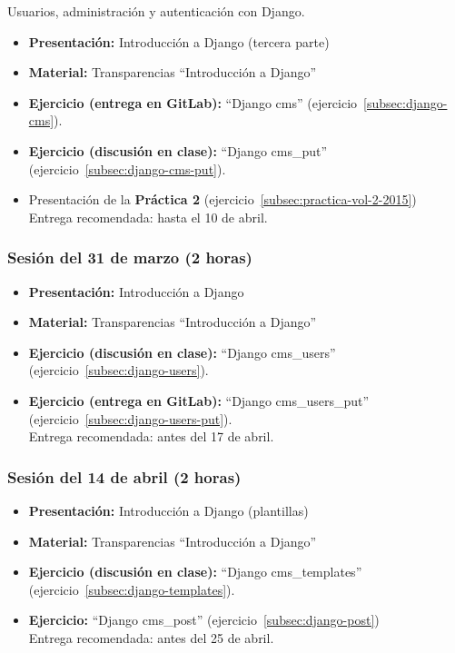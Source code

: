 \documentclass[a4paper,12pt]{article}
\begin{document}
Usuarios, administración y autenticación con Django.

\begin{itemize}
 \item \textbf{Presentación:} Introducción a Django (tercera parte)
 \item \textbf{Material:} Transparencias ``Introducción a Django''
 \item \textbf{Ejercicio  (entrega en GitLab):} ``Django cms'' (ejercicio~\ref{subsec:django-cms}). \\
 \item \textbf{Ejercicio (discusión en clase):} ``Django cms\_put'' (ejercicio~\ref{subsec:django-cms-put}).
 \item Presentación de la \textbf{Práctica 2} (ejercicio~\ref{subsec:practica-vol-2-2015}) \\
  Entrega recomendada: hasta el 10 de abril.
\end{itemize}

\subsubsection{Sesión del 31 de marzo (2 horas)}

\begin{itemize}
 \item \textbf{Presentación:} Introducción a Django
 \item \textbf{Material:} Transparencias ``Introducción a Django''
 \item \textbf{Ejercicio (discusión en clase):} ``Django cms\_users'' (ejercicio~\ref{subsec:django-users}).
 \item \textbf{Ejercicio (entrega en GitLab):} ``Django cms\_users\_put'' (ejercicio~\ref{subsec:django-users-put}). \\
  Entrega recomendada: antes del 17 de abril.
\end{itemize}


\subsubsection{Sesión del 14 de abril (2 horas)}

\begin{itemize}
 \item \textbf{Presentación:} Introducción a Django (plantillas)
 \item \textbf{Material:} Transparencias ``Introducción a Django''
 \item \textbf{Ejercicio (discusión en clase):} ``Django cms\_templates'' (ejercicio~\ref{subsec:django-templates}).
 \item \textbf{Ejercicio:} ``Django cms\_post'' (ejercicio~\ref{subsec:django-post}) \\
  Entrega recomendada: antes del 25 de abril.
\end{itemize}
\end{document}

